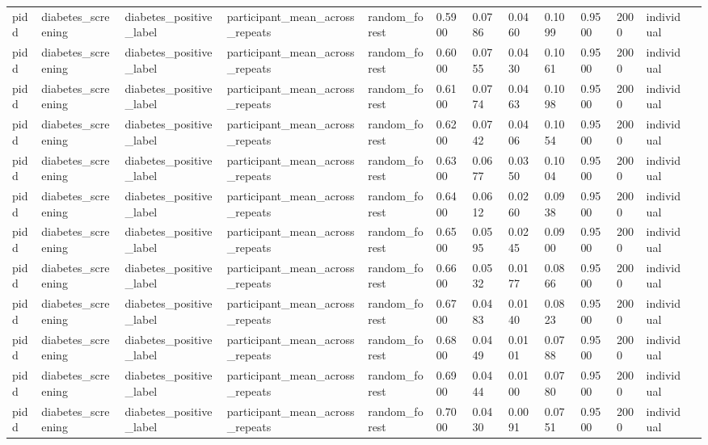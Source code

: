\begin{tabular}{lllllllllllll}
pidd & diabetes\_screening & diabetes\_positive\_label & participant\_mean\_across\_repeats & random\_forest & 0.5900 & 0.0786 & 0.0460 & 0.1099 & 0.9500 & 2000 & individual &  \\
pidd & diabetes\_screening & diabetes\_positive\_label & participant\_mean\_across\_repeats & random\_forest & 0.6000 & 0.0755 & 0.0430 & 0.1061 & 0.9500 & 2000 & individual &  \\
pidd & diabetes\_screening & diabetes\_positive\_label & participant\_mean\_across\_repeats & random\_forest & 0.6100 & 0.0774 & 0.0463 & 0.1098 & 0.9500 & 2000 & individual &  \\
pidd & diabetes\_screening & diabetes\_positive\_label & participant\_mean\_across\_repeats & random\_forest & 0.6200 & 0.0742 & 0.0406 & 0.1054 & 0.9500 & 2000 & individual &  \\
pidd & diabetes\_screening & diabetes\_positive\_label & participant\_mean\_across\_repeats & random\_forest & 0.6300 & 0.0677 & 0.0350 & 0.1004 & 0.9500 & 2000 & individual &  \\
pidd & diabetes\_screening & diabetes\_positive\_label & participant\_mean\_across\_repeats & random\_forest & 0.6400 & 0.0612 & 0.0260 & 0.0938 & 0.9500 & 2000 & individual &  \\
pidd & diabetes\_screening & diabetes\_positive\_label & participant\_mean\_across\_repeats & random\_forest & 0.6500 & 0.0595 & 0.0245 & 0.0900 & 0.9500 & 2000 & individual &  \\
pidd & diabetes\_screening & diabetes\_positive\_label & participant\_mean\_across\_repeats & random\_forest & 0.6600 & 0.0532 & 0.0177 & 0.0866 & 0.9500 & 2000 & individual &  \\
pidd & diabetes\_screening & diabetes\_positive\_label & participant\_mean\_across\_repeats & random\_forest & 0.6700 & 0.0483 & 0.0140 & 0.0823 & 0.9500 & 2000 & individual &  \\
pidd & diabetes\_screening & diabetes\_positive\_label & participant\_mean\_across\_repeats & random\_forest & 0.6800 & 0.0449 & 0.0101 & 0.0788 & 0.9500 & 2000 & individual &  \\
pidd & diabetes\_screening & diabetes\_positive\_label & participant\_mean\_across\_repeats & random\_forest & 0.6900 & 0.0444 & 0.0100 & 0.0780 & 0.9500 & 2000 & individual &  \\
pidd & diabetes\_screening & diabetes\_positive\_label & participant\_mean\_across\_repeats & random\_forest & 0.7000 & 0.0430 & 0.0091 & 0.0751 & 0.9500 & 2000 & individual &  \\

\end{tabular}
